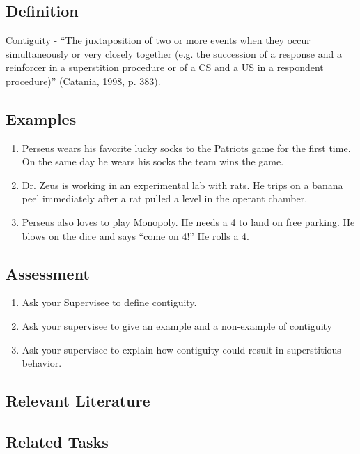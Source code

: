 \clearpage \section{\fourFKThirtyTwo{}}
\subsection{Definition}
Contiguity - ``The juxtaposition of two or more events when they occur simultaneously or very closely together (e.g. the succession of a response and a reinforcer in a superstition procedure or of a CS and a US in a respondent procedure)'' (Catania, 1998, p. 383).
%
\subsection{Examples}
\begin{enumerate}
\item Perseus wears his favorite lucky socks to the Patriots game for the first time.  On the same day he wears his socks the team wins the game.  
\item Dr. Zeus is working in an experimental lab with rats.  He trips on a banana peel immediately after a rat pulled a level in the operant chamber. 
\item Perseus also loves to play Monopoly. He needs a 4 to land on free parking. He blows on the dice and says ``come on 4!'' He rolls a 4.
%
\end{enumerate}
%
\subsection{Assessment}
\begin{enumerate}
\item Ask your Supervisee to define contiguity.
\item Ask your supervisee to give an example and a non-example of contiguity
\item Ask your supervisee to explain how contiguity could result in superstitious behavior. 
%
\end{enumerate}
%
\subsection{Relevant Literature}
\begin{refsection}
\nocite{buehner2005contiguity,
        catania1998learning,
        shanks1989temporal}
\printbibliography[heading=none]
\end{refsection}
%
\subsection{Related Tasks}
\fourFKFourteen{}\\
\fourFKTwentyFour{}\\
\fourFKThirtyTwo{}\\
\fourFKThirtySix{}\\
